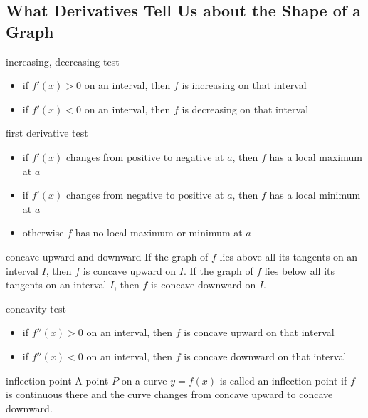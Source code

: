\documentclass[Calculus 1 Recitation.tex]{subfiles}
\begin{document}
\subsection{What Derivatives Tell Us about the Shape of a Graph}

\begin{myleftlinebox}
	increasing, decreasing test
	\tcblower
	\begin{itemize}
		\item if $f'(x)>0$ on an interval, then $f$ is increasing on that interval
		\item if $f'(x)<0$ on an interval, then $f$ is decreasing on that interval
	\end{itemize}
\end{myleftlinebox}

\begin{myleftlinebox}
	first derivative test
	\tcblower
	\begin{itemize}
		\item if $f'(x)$ changes from positive to negative at $a$, then $f$ has a local maximum at $a$
		\item if $f'(x)$ changes from negative to positive at $a$, then $f$ has a local minimum at $a$
		\item otherwise $f$ has no local maximum or minimum at $a$
	\end{itemize}
\end{myleftlinebox}

\begin{myleftlinebox}
	concave upward and downward
	\tcblower
	If the graph of $f$ lies above all its tangents on an interval $I$, then $f$ is concave upward on $I$. If the graph of $f$ lies below all its tangents on an interval $I$, then $f$ is concave downward on $I$.
\end{myleftlinebox}

\begin{myleftlinebox}
	concavity test
	\tcblower
	\begin{itemize}
		\item if $f''(x)>0$ on an interval, then $f$ is concave upward on that interval
		\item if $f''(x)<0$ on an interval, then $f$ is concave downward on that interval
	\end{itemize}
\end{myleftlinebox}

\begin{myleftlinebox}
	inflection point
	\tcblower
	A point $P$ on a curve $y = f(x)$ is called an inflection point if $f$ is continuous there and the curve changes from concave upward to concave downward.
\end{myleftlinebox}
\end{document}
